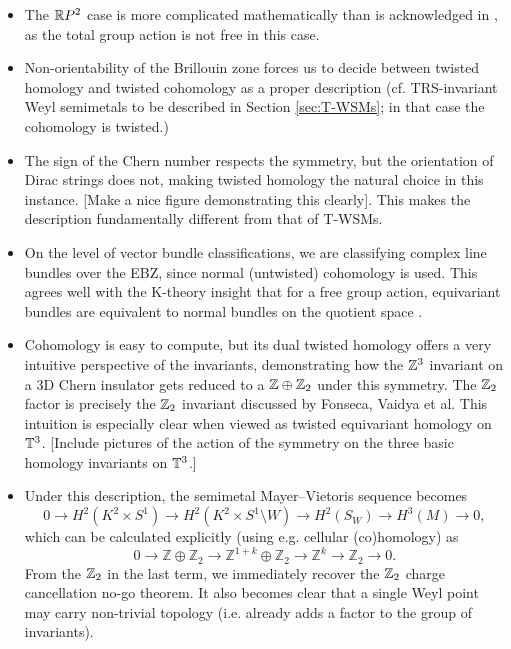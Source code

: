 {\color{blue}
\begin{itemize}		
	\item The $\mathbb{R} P^2$ case is more complicated mathematically than is acknowledged in \cite{Fonseca-Vaidya_nonorientable}, as the total group action is not free in this case. 
	
	\item Non-orientability of the Brillouin zone forces us to decide between twisted homology and twisted cohomology as a proper description (cf. TRS-invariant Weyl semimetals to be described in Section \ref{sec:T-WSMs}; in that case the cohomology is twisted.)
	
	\item The sign of the Chern number respects the symmetry, but the orientation of Dirac strings does not, making twisted homology the natural choice in this instance. [Make a nice figure demonstrating this clearly]. This makes the description fundamentally different from that of T-WSMs.
	
	\item On the level of vector bundle classifications, we are classifying complex line bundles over the EBZ, since normal (untwisted) cohomology is used. This agrees well with the K-theory insight that for a free group action, equivariant bundles are equivalent to normal bundles on the quotient space \parencite[Prop. 2.1]{Segal_K-theory}.
	
	\item Cohomology is easy to compute, but its dual twisted homology offers a very intuitive perspective of the invariants, demonstrating how the $\mathbb{Z}^3$ invariant on a 3D Chern insulator gets reduced to a $\mathbb{Z}\oplus\mathbb{Z}_2$ under this symmetry. The $\mathbb{Z}_2$ factor is precisely the $\mathbb{Z}_2$ invariant discussed by Fonseca, Vaidya et al. This intuition is especially clear when viewed as twisted equivariant homology on $\mathbb{T}^3$. [Include pictures of the action of the symmetry on the three basic homology invariants on $\mathbb{T}^3$.]
	
	\item Under this description, the semimetal Mayer--Vietoris sequence becomes
	\begin{equation*}
		0\to H^2(K^2\times S^1) \to H^2(K^2\times S^1\setminus W) \to H^2(S_W) \to H^3(M) \to 0,
	\end{equation*}
	which can be calculated explicitly (using e.g. cellular (co)homology) as
	\begin{equation*}
		0\to \mathbb{Z}\oplus\mathbb{Z}_2 \to \mathbb{Z}^{1+k}\oplus\mathbb{Z}_2 \to \mathbb{Z}^k \to \mathbb{Z}_2 \to 0.
	\end{equation*}
	From the $\mathbb{Z}_2$ in the last term, we immediately recover the $\mathbb{Z}_2$ charge cancellation no-go theorem. It also becomes clear that a single Weyl point may carry non-trivial topology (i.e. already adds a factor to the group of invariants).
\end{itemize}

}
